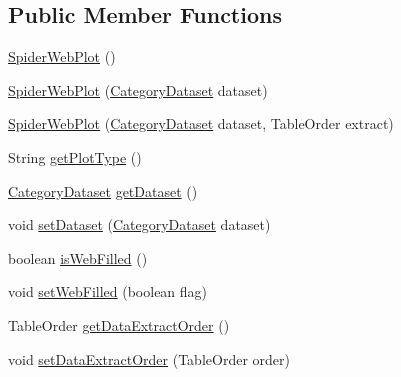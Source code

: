 \subsection*{Public Member Functions}
\begin{DoxyCompactItemize}
\item 
\mbox{\hyperlink{classorg_1_1jfree_1_1chart_1_1plot_1_1_spider_web_plot_a02a68871ce770ca4e4d1c888aa3bb754}{Spider\+Web\+Plot}} ()
\item 
\mbox{\hyperlink{classorg_1_1jfree_1_1chart_1_1plot_1_1_spider_web_plot_a432457f99fbe7ef662d8c53c203e1d60}{Spider\+Web\+Plot}} (\mbox{\hyperlink{interfaceorg_1_1jfree_1_1data_1_1category_1_1_category_dataset}{Category\+Dataset}} dataset)
\item 
\mbox{\hyperlink{classorg_1_1jfree_1_1chart_1_1plot_1_1_spider_web_plot_a37967a697040475aa654713cc8f32a9e}{Spider\+Web\+Plot}} (\mbox{\hyperlink{interfaceorg_1_1jfree_1_1data_1_1category_1_1_category_dataset}{Category\+Dataset}} dataset, Table\+Order extract)
\item 
String \mbox{\hyperlink{classorg_1_1jfree_1_1chart_1_1plot_1_1_spider_web_plot_ae5e9ffe5d0344fa7fb7ddc4f5e7774f3}{get\+Plot\+Type}} ()
\item 
\mbox{\hyperlink{interfaceorg_1_1jfree_1_1data_1_1category_1_1_category_dataset}{Category\+Dataset}} \mbox{\hyperlink{classorg_1_1jfree_1_1chart_1_1plot_1_1_spider_web_plot_ad7f61479dddf8cce633d3192d37e732e}{get\+Dataset}} ()
\item 
void \mbox{\hyperlink{classorg_1_1jfree_1_1chart_1_1plot_1_1_spider_web_plot_a23333c2d4229d0ab0d4cf3671b661e0a}{set\+Dataset}} (\mbox{\hyperlink{interfaceorg_1_1jfree_1_1data_1_1category_1_1_category_dataset}{Category\+Dataset}} dataset)
\item 
boolean \mbox{\hyperlink{classorg_1_1jfree_1_1chart_1_1plot_1_1_spider_web_plot_ac4667ef97e694a1b7de3ed87c73f29e4}{is\+Web\+Filled}} ()
\item 
void \mbox{\hyperlink{classorg_1_1jfree_1_1chart_1_1plot_1_1_spider_web_plot_aea33b93e61e56e9feec42809d7138707}{set\+Web\+Filled}} (boolean flag)
\item 
Table\+Order \mbox{\hyperlink{classorg_1_1jfree_1_1chart_1_1plot_1_1_spider_web_plot_a858c1204ab0567e08d765226ff57d2b3}{get\+Data\+Extract\+Order}} ()
\item 
void \mbox{\hyperlink{classorg_1_1jfree_1_1chart_1_1plot_1_1_spider_web_plot_a44453e46effe569cfbfd96c3a0667a3d}{set\+Data\+Extract\+Order}} (Table\+Order order)
\item 

\end{DoxyCompactItemize}
